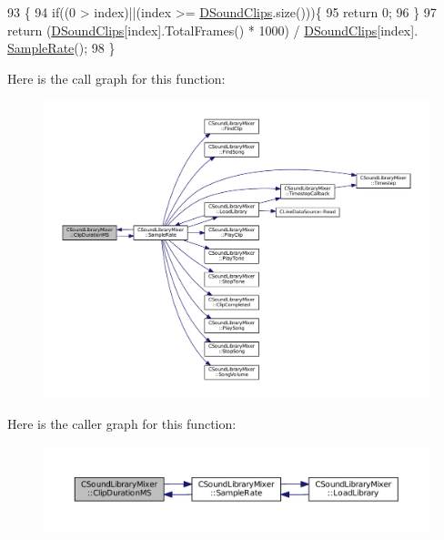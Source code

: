 \begin{DoxyCode}
93                                                \{
94     \textcolor{keywordflow}{if}((0 > index)||(index >= \hyperlink{classCSoundLibraryMixer_af4a006eacdcd590fad6e02cddaf197c2}{DSoundClips}.size()))\{
95         \textcolor{keywordflow}{return} 0;    
96     \}
97     \textcolor{keywordflow}{return} (\hyperlink{classCSoundLibraryMixer_af4a006eacdcd590fad6e02cddaf197c2}{DSoundClips}[index].TotalFrames() * 1000) / \hyperlink{classCSoundLibraryMixer_af4a006eacdcd590fad6e02cddaf197c2}{DSoundClips}[index].
      \hyperlink{classCSoundLibraryMixer_a03221f151dfe72381da5d0d0539bab94}{SampleRate}();
98 \}
\end{DoxyCode}
Here is the call graph for this function\+:
\nopagebreak
\begin{figure}[H]
\begin{center}
\leavevmode
\includegraphics[width=350pt]{classCSoundLibraryMixer_a0492c587cb62cd8945880a7de3dad490_cgraph}
\end{center}
\end{figure}
Here is the caller graph for this function\+:
\nopagebreak
\begin{figure}[H]
\begin{center}
\leavevmode
\includegraphics[width=350pt]{classCSoundLibraryMixer_a0492c587cb62cd8945880a7de3dad490_icgraph}
\end{center}
\end{figure}
\hypertarget{classCSoundLibraryMixer_ad8cc956bda999fe677e92f7392834b7a}{}\label{classCSoundLibraryMixer_ad8cc956bda999fe677e92f7392834b7a} 
